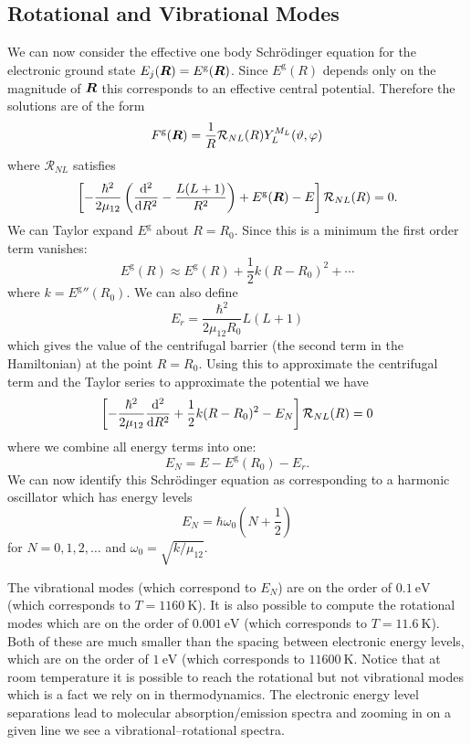 \documentclass[a4paper]{article}
\newcommand{\gerade}{\mathrm{g}}
\begin{document}
    \subsection{Rotational and Vibrational Modes}
    We can now consider the effective one body Schr\"odinger equation for the electronic ground state \(E_j(\vv{R}) = E^{\gerade}(\vv{R})\).
    Since \(E^{\gerade}(R)\) depends only on the magnitude of \(\bm{R}\) this corresponds to an effective central potential.
    Therefore the solutions are of the form
    \[F^{\gerade}(\vv{R}) = \frac{1}{R}\mathcal{R}_{NL}(R)Y_{L}^{M_L}(\vartheta, \varphi)\]
    where \(\mathcal{R}_{NL}\) satisfies
    \[\left[ -\frac{\hbar^2}{2\mu_{12}}\left( \dv[2]{R} - \frac{L(L + 1)}{R^2} \right) + E^{\gerade}(\vv{R}) - E \right]\mathcal{R}_{NL}(R) = 0.\]
    We can Taylor expand \(E^{\gerade}\) about \(R = R_0\).
    Since this is a minimum the first order term vanishes:
    \[E^{\gerade}(R) \approx E^{\gerade}(R) + \frac{1}{2}k(R - R_0)^2 + \dotsb\]
    where \(k = E^{\gerade}{''}(R_0)\).
    We can also define
    \[E_r = \frac{\hbar^2}{2\mu_{12}R_0}L(L + 1)\]
    which gives the value of the centrifugal barrier (the second term in the Hamiltonian) at the point \(R = R_0\).
    Using this to approximate the centrifugal term and the Taylor series to approximate the potential we have
    \[\left[ -\frac{\hbar^2}{2\mu_{12}}\dv[2]{}{R} + \frac{1}{2}k(R - R_0)^2 - E_N \right]\mathcal{R}_{NL}(R) = 0\]
    where we combine all energy terms into one:
    \[E_N = E - E^{\gerade}(R_0) - E_r.\]
    We can now identify this Schr\"odinger equation as corresponding to a harmonic oscillator which has energy levels
    \[E_N = \hbar\omega_0\left( N + \frac{1}{2} \right)\]
    for \(N = 0, 1, 2, \dotsc\) and \(\omega_0 = \sqrt{k/\mu_{12}}\).
    
    The vibrational modes (which correspond to \(E_N\)) are on the order of \(\SI{0.1}{\electronvolt}\) (which corresponds to \(T = \SI{1160}{\kelvin}\)).
    It is also possible to compute the rotational modes which are on the order of \(\SI{0.001}{\electronvolt}\) (which corresponds to \(T = \SI{11.6}{\kelvin}\)).
    Both of these are much smaller than the spacing between electronic energy levels, which are on the order of \(\SI{1}{\electronvolt}\) (which corresponds to \(\SI{11600}{\kelvin}\).
    Notice that at room temperature it is possible to reach the rotational but not vibrational modes which is a fact we rely on in thermodynamics.
    The electronic energy level separations lead to molecular absorption/emission spectra and zooming in on a given line we see a vibrational--rotational spectra.
    
\end{document}

